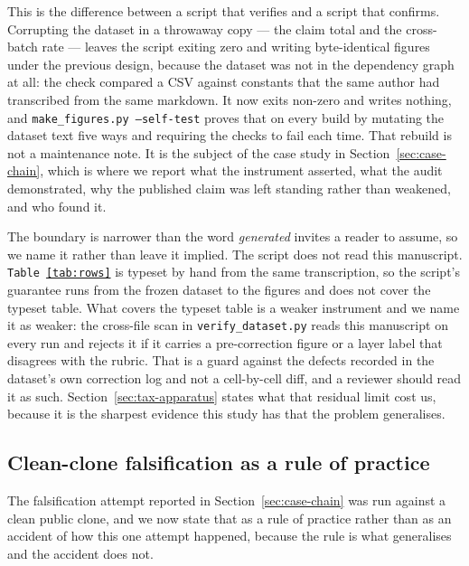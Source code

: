 \documentclass[sigconf,review]{acmart}
\begin{document}
This is the difference between a script that verifies and a script that
confirms. Corrupting the dataset in a throwaway copy --- the claim total and
the cross-batch rate --- leaves the script exiting zero and writing
byte-identical figures under the previous design, because the dataset was not
in the dependency graph at all: the check compared a CSV against constants
that the same author had transcribed from the same markdown. It now exits
non-zero and writes nothing, and \texttt{make\_figures.py --self-test} proves
that on every build by mutating the dataset text five ways and requiring the
checks to fail each time. That rebuild is not a maintenance note. It is the
subject of the case study in Section~\ref{sec:case-chain}, which is where we
report what the instrument asserted, what the audit demonstrated, why the
published claim was left standing rather than weakened, and who found it.

The boundary is narrower than the word \emph{generated} invites a reader to
assume, so we name it rather than leave it implied. The script does not read
this manuscript. \texttt{Table~\ref{tab:rows}} is typeset by hand from the same
transcription, so the script's guarantee runs from the frozen dataset to the
figures and does not cover the typeset table. What covers the typeset table is
a weaker instrument and we name it as weaker: the cross-file scan in
\texttt{verify\_dataset.py} reads this manuscript on every run and rejects it if
it carries a pre-correction figure or a layer label that disagrees with the
rubric. That is a guard against the defects recorded in the dataset's own
correction log and not a cell-by-cell diff, and a reviewer should read it as
such. Section~\ref{sec:tax-apparatus} states what that residual limit cost us,
because it is the sharpest evidence this study has that the problem
generalises.

\subsection{Clean-clone falsification as a rule of practice}
\label{sec:method-falsify}

The falsification attempt reported in Section~\ref{sec:case-chain} was run
against a clean public clone, and we now state that as a rule of practice
rather than as an accident of how this one attempt happened, because the rule
is what generalises and the accident does not.
\end{document}
